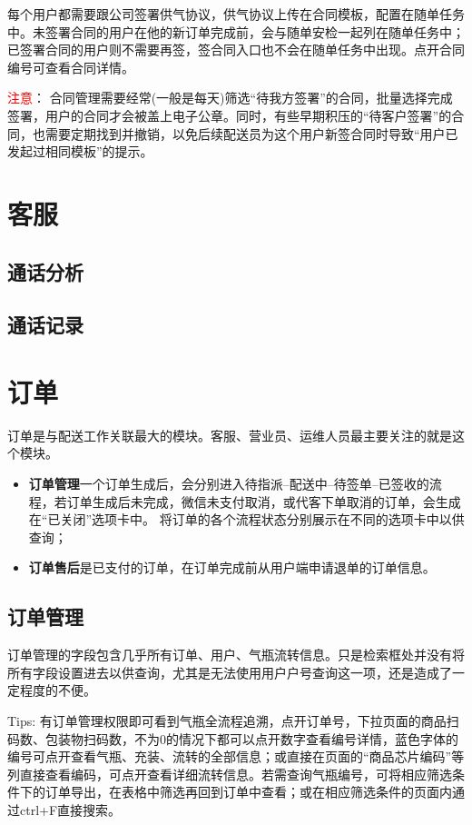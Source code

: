\documentclass[UTF8]{ctexart}
\begin{document}
每个用户都需要跟公司签署供气协议，供气协议上传在合同模板，配置在随单任务中。未签署合同的用户在他的新订单完成前，会与随单安检一起列在随单任务中；已签署合同的用户则不需要再签，签合同入口也不会在随单任务中出现。点开合同编号可查看合同详情。

\textcolor{red}{注意}：
合同管理需要经常(一般是每天)筛选“待我方签署”的合同，批量选择完成签署，用户的合同才会被盖上电子公章。同时，有些早期积压的“待客户签署”的合同，也需要定期找到并撤销，以免后续配送员为这个用户新签合同时导致“用户已发起过相同模板”的提示。



\section{客服}

\subsection{通话分析}


\subsection{通话记录}


\section{订单}

订单是与配送工作关联最大的模块。客服、营业员、运维人员最主要关注的就是这个模块。
\begin{itemize}
	\item \textbf{订单管理}一个订单生成后，会分别进入待指派--配送中--待签单--已签收的流程，若订单生成后未完成，微信未支付取消，或代客下单取消的订单，会生成在“已关闭”选项卡中。
将订单的各个流程状态分别展示在不同的选项卡中以供查询；
    \item \textbf{订单售后}是已支付的订单，在订单完成前从用户端申请退单的订单信息。
\end{itemize}
\subsection{订单管理}

订单管理的字段包含几乎所有订单、用户、气瓶流转信息。只是检索框处并没有将所有字段设置进去以供查询，尤其是无法使用用户户号查询这一项，还是造成了一定程度的不便。

Tips: 有订单管理权限即可看到气瓶全流程追溯，点开订单号，下拉页面的商品扫码数、包装物扫码数，不为0的情况下都可以点开数字查看编号详情，蓝色字体的编号可点开查看气瓶、充装、流转的全部信息；或直接在页面的“商品芯片编码”等列直接查看编码，可点开查看详细流转信息。若需查询气瓶编号，可将相应筛选条件下的订单导出，在表格中筛选再回到订单中查看；或在相应筛选条件的页面内通过ctrl+F直接搜索。
\end{document}
